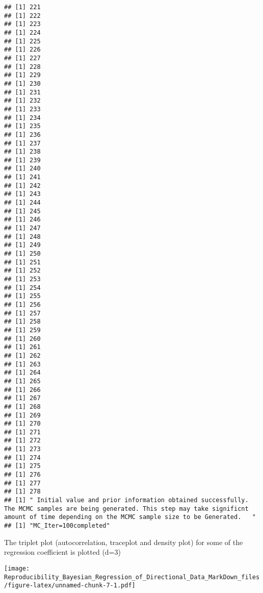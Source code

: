 \documentclass[
]{article}
\newenvironment{Shaded}{\begin{snugshade}}{\end{snugshade}}
\newcommand{\AttributeTok}[1]{\textcolor[rgb]{0.13,0.29,0.53}{#1}}
\newcommand{\CommentTok}[1]{\textcolor[rgb]{0.56,0.35,0.01}{\textit{#1}}}
\newcommand{\DecValTok}[1]{\textcolor[rgb]{0.00,0.00,0.81}{#1}}
\newcommand{\FunctionTok}[1]{\textcolor[rgb]{0.13,0.29,0.53}{\textbf{#1}}}
\newcommand{\NormalTok}[1]{#1}
\newcommand{\OtherTok}[1]{\textcolor[rgb]{0.56,0.35,0.01}{#1}}
\newcommand{\SpecialCharTok}[1]{\textcolor[rgb]{0.81,0.36,0.00}{\textbf{#1}}}
\begin{document}
\begin{verbatim}
## [1] 221
## [1] 222
## [1] 223
## [1] 224
## [1] 225
## [1] 226
## [1] 227
## [1] 228
## [1] 229
## [1] 230
## [1] 231
## [1] 232
## [1] 233
## [1] 234
## [1] 235
## [1] 236
## [1] 237
## [1] 238
## [1] 239
## [1] 240
## [1] 241
## [1] 242
## [1] 243
## [1] 244
## [1] 245
## [1] 246
## [1] 247
## [1] 248
## [1] 249
## [1] 250
## [1] 251
## [1] 252
## [1] 253
## [1] 254
## [1] 255
## [1] 256
## [1] 257
## [1] 258
## [1] 259
## [1] 260
## [1] 261
## [1] 262
## [1] 263
## [1] 264
## [1] 265
## [1] 266
## [1] 267
## [1] 268
## [1] 269
## [1] 270
## [1] 271
## [1] 272
## [1] 273
## [1] 274
## [1] 275
## [1] 276
## [1] 277
## [1] 278
## [1] " Initial value and prior information obtained successfully.  The MCMC samples are being generated. This step may take significnt amount of time depending on the MCMC sample size to be Generated.   "
## [1] "MC_Iter=100completed"
\end{verbatim}

The triplet plot (autocorrelation, traceplot and density plot) for some
of the regression coefficient is plotted (d=3)

\begin{Shaded}
\end{Shaded}

\texttt{[image: Reproducibility\_Bayesian\_Regression\_of\_Directional\_Data\_MarkDown\_files/figure-latex/unnamed-chunk-7-1.pdf]}

\begin{Shaded}
\end{Shaded}
\end{document}
